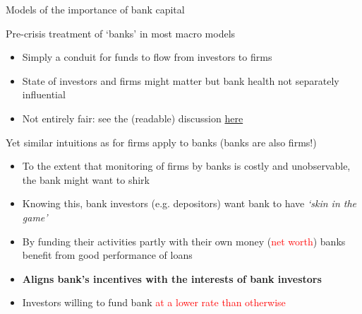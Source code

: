 

\begin{frame}{Models of the importance of bank capital}

Pre-crisis treatment of `banks' in most macro models
	\begin{itemize}
	\item	Simply a conduit for funds to flow from investors to firms
	\item	State of investors and firms might matter but bank health not separately influential
	\item	Not entirely fair: see the (readable) discussion \href{https://www.jstor.org/stable/2138389}{here}
	\end{itemize}
\vspace{2mm}
Yet similar intuitions as for firms apply to banks (banks are also firms!)
	\begin{itemize}
	\item	To the extent that monitoring of firms by banks is costly and unobservable, the bank might want to shirk
	\item	Knowing this, bank investors (e.g. depositors) want bank to have \textit{`skin in the game'}
	\item	By funding their activities partly with their own money (\textcolor{red}{net worth}) banks benefit from good performance of loans
	\item	\textbf{Aligns bank's incentives with the interests of bank investors}
	\item	Investors willing to fund bank \textcolor{red}{at a lower rate than otherwise}
	\end{itemize}

\end{frame}
